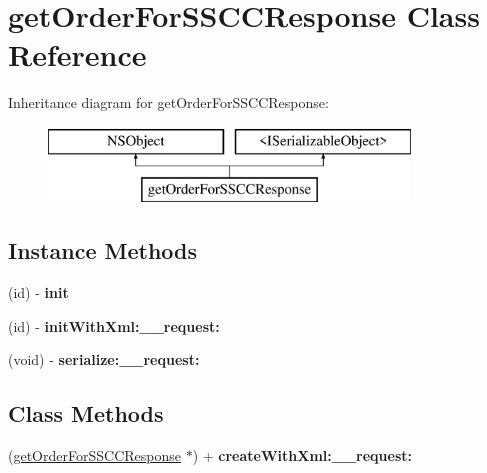\hypertarget{interfaceget_order_for_s_s_c_c_response}{}\section{get\+Order\+For\+S\+S\+C\+C\+Response Class Reference}
\label{interfaceget_order_for_s_s_c_c_response}
Inheritance diagram for get\+Order\+For\+S\+S\+C\+C\+Response\+:\begin{figure}[H]
\begin{center}
\leavevmode
\includegraphics[height=2.000000cm]{interfaceget_order_for_s_s_c_c_response}
\end{center}
\end{figure}
\subsection*{Instance Methods}
\begin{DoxyCompactItemize}
\item 
\hypertarget{interfaceget_order_for_s_s_c_c_response_a0de748f0a88f547a70f1201ca3df1531}{}(id) -\/ {\bfseries init}\label{interfaceget_order_for_s_s_c_c_response_a0de748f0a88f547a70f1201ca3df1531}

\item 
\hypertarget{interfaceget_order_for_s_s_c_c_response_a7dc32d1070d893f534c43ec0a4977bca}{}(id) -\/ {\bfseries init\+With\+Xml\+:\+\_\+\+\_\+request\+:}\label{interfaceget_order_for_s_s_c_c_response_a7dc32d1070d893f534c43ec0a4977bca}

\item 
\hypertarget{interfaceget_order_for_s_s_c_c_response_a2fe7a4eb1b009f3e15bd814e5c9b802f}{}(void) -\/ {\bfseries serialize\+:\+\_\+\+\_\+request\+:}\label{interfaceget_order_for_s_s_c_c_response_a2fe7a4eb1b009f3e15bd814e5c9b802f}

\end{DoxyCompactItemize}
\subsection*{Class Methods}
\begin{DoxyCompactItemize}
\item 
\hypertarget{interfaceget_order_for_s_s_c_c_response_aa627ef410d9a8584db8db6497353daa3}{}(\hyperlink{interfaceget_order_for_s_s_c_c_response}{get\+Order\+For\+S\+S\+C\+C\+Response} $\ast$) + {\bfseries create\+With\+Xml\+:\+\_\+\+\_\+request\+:}\label{interfaceget_order_for_s_s_c_c_response_aa627ef410d9a8584db8db6497353daa3}

\end{DoxyCompactItemize}
